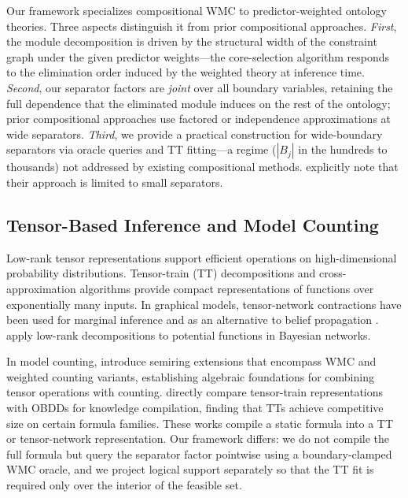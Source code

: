 \documentclass[12pt]{article}
\begin{document}
Our framework specializes compositional WMC to predictor-weighted
ontology theories. Three aspects distinguish it from prior compositional
approaches. \emph{First}, the module decomposition is driven by the
structural width of the constraint graph under the given predictor
weights---the core-selection algorithm responds to the elimination order
induced by the weighted theory at inference time. \emph{Second}, our
separator factors are \emph{joint} over all boundary variables,
retaining the full dependence that the eliminated module induces on the
rest of the ontology; prior compositional approaches use factored or
independence approximations at wide separators. \emph{Third}, we provide
a practical construction for wide-boundary separators via oracle queries
and TT fitting---a regime ($|B_j|$ in the hundreds to thousands) not
addressed by existing compositional methods. \citet{dal2021compositional}
explicitly note that their approach is limited to small separators.

\subsection{Tensor-Based Inference and Model Counting}

Low-rank tensor representations support efficient operations on
high-dimensional probability distributions. Tensor-train (TT)
decompositions \citep{oseledets2011tt} and cross-approximation
algorithms \citep{oseledets2010ttcross} provide compact representations
of functions over exponentially many inputs. In graphical models,
tensor-network contractions have been used for marginal inference
\citep{novikov2014mrf} and as an alternative to belief propagation
\citep{wrigley2017tensorbp}. \citet{ducamp2020lowrank} apply low-rank
decompositions to potential functions in Bayesian networks.

In model counting, \citet{goral2024semiring} introduce semiring
extensions that encompass WMC and weighted counting variants,
establishing algebraic foundations for combining tensor operations with
counting. \citet{onaka2025ttkc} directly compare tensor-train
representations with OBDDs for knowledge compilation, finding that TTs
achieve competitive size on certain formula families. These works compile
a static formula into a TT or tensor-network representation. Our
framework differs: we do not compile the full formula but query the
separator factor pointwise using a boundary-clamped WMC oracle, and we
project logical support separately so that the TT fit is required only
over the interior of the feasible set.
\end{document}
